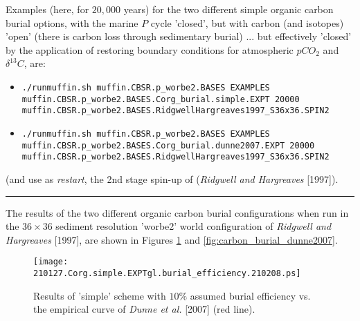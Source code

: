 \vspace{2mm}

\noindent Examples (here, for \(20,000\) years) for the two different simple organic carbon burial options, with the marine \(P\) cycle 'closed', but with carbon (and isotopes) 'open' (there is carbon loss through sedimentary burial) ... but effectively 'closed' by the application of restoring boundary conditions for atmospheric \(pCO_{2}\) and \(\delta^{13}C\), are:
\begin{itemize}[noitemsep]
\vspace{1mm}
\item []
\small\vspace{-0mm}\begin{verbatim}
./runmuffin.sh muffin.CBSR.p_worbe2.BASES EXAMPLES
muffin.CBSR.p_worbe2.BASES.Corg_burial.simple.EXPT 20000
muffin.CBSR.p_worbe2.BASES.RidgwellHargreaves1997_S36x36.SPIN2
\end{verbatim}\vspace{-0mm}\normalsize
\vspace{1mm}
\item []
\small\vspace{-0mm}\begin{verbatim}
./runmuffin.sh muffin.CBSR.p_worbe2.BASES EXAMPLES
muffin.CBSR.p_worbe2.BASES.Corg_burial.dunne2007.EXPT 20000
muffin.CBSR.p_worbe2.BASES.RidgwellHargreaves1997_S36x36.SPIN2
\end{verbatim}\vspace{-0mm}\normalsize
\end{itemize}
(and use as \textit{restart}, the 2nd stage spin-up of (\textit{Ridgwell and Hargreaves} [1997]).

\vspace{1mm}
\noindent\rule{4cm}{0.5pt}
\vspace{2mm}

\newpage
%
\noindent The results of the two different organic carbon burial configurations when run in the \(36\times 36\) sediment resolution 'worbe2' world configuration of \textit{Ridgwell and Hargreaves} [1997], are shown in Figures \ref{fig:carbon_burial_simple} and \ref{fig:carbon_burial_dunne2007}.

\begin{figure}[H]
\texttt{[image: 210127.Corg.simple.EXPTgl.burial\_efficiency.210208.ps]}
\caption{Results of 'simple' scheme with \(10\%\) assumed burial efficiency vs. the empirical curve of \textit{Dunne et al.} [2007] (red line).}
\label{fig:carbon_burial_simple}
\end{figure}

